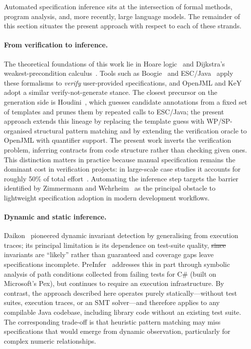 \documentclass[11pt]{article}
\makeatletter
\providecommand{\DIFaddtex}[1]{{\protect\color{blue}\uwave{#1}}} %
\providecommand{\DIFdeltex}[1]{{\protect\color{red}\sout{#1}}} %
\providecommand{\DIFaddbegin}{} %
\providecommand{\DIFaddend}{} %
\providecommand{\DIFdelbegin}{} %
\providecommand{\DIFdelend}{} %
\providecommand{\DIFadd}[1]{\texorpdfstring{\DIFaddtex{#1}}{#1}} %
\providecommand{\DIFdel}[1]{\texorpdfstring{\DIFdeltex{#1}}{}} %
\providecommand{\DIFscaledelfig}{0.5}
\newlength{\DIFdelgraphicswidth} %
\newlength{\DIFdelgraphicsheight} %
\providecommand{\DIFaddincludegraphics}[2][]{{\color{blue}\fbox{\DIFOincludegraphics[#1]{#2}}}} %
\providecommand{\DIFdelincludegraphics}[2][]{%
\sbox{\DIFdelgraphicsbox}{\DIFOincludegraphics[#1]{#2}}%
\settoboxwidth{\DIFdelgraphicswidth}{\DIFdelgraphicsbox} %
\settoboxtotalheight{\DIFdelgraphicsheight}{\DIFdelgraphicsbox} %
\scalebox{\DIFscaledelfig}{%
\parbox[b]{\DIFdelgraphicswidth}{\usebox{\DIFdelgraphicsbox}\\[-\baselineskip] \rule{\DIFdelgraphicswidth}{0em}}\llap{\resizebox{\DIFdelgraphicswidth}{\DIFdelgraphicsheight}{%
\setlength{\unitlength}{\DIFdelgraphicswidth}%
\begin{picture}(1,1)%
\thicklines\linethickness{2pt} %
{\color[rgb]{1,0,0}\put(0,0){\framebox(1,1){}}}%
{\color[rgb]{1,0,0}\put(0,0){\line( 1,1){1}}}%
{\color[rgb]{1,0,0}\put(0,1){\line(1,-1){1}}}%
\end{picture}%
}\hspace*{3pt}}} %
} %
\DeclareRobustCommand{\DIFaddbegin}{\DIFOaddbegin \let\includegraphics\DIFaddincludegraphics} %
\DeclareRobustCommand{\DIFaddend}{\DIFOaddend \let\includegraphics\DIFOincludegraphics} %
\DeclareRobustCommand{\DIFdelbegin}{\DIFOdelbegin \let\includegraphics\DIFdelincludegraphics} %
\DeclareRobustCommand{\DIFdelend}{\DIFOaddend \let\includegraphics\DIFOincludegraphics} %
\let\sout@orig\sout %
\renewcommand{\sout}[1]{\ifmmode\text{\sout@orig{\ensuremath{#1}}}\else\sout@orig{#1}\fi} %
\makeatother
\begin{document}
Automated specification inference sits at the intersection of formal methods, program analysis, and, more recently, large language models. The remainder of this section situates the present approach with respect to each of these strands.

\paragraph{From verification to inference.}
The theoretical foundations of this work lie in Hoare logic~\cite{hoare1969axiomatic} and Dijkstra's weakest-precondition calculus~\cite{dijkstra_guarded_1975, dijkstra1976discipline}. Tools such as Boogie~\cite{barnett2005weakest} and ESC/Java~\cite{flanagan2002extended, chalin2010jml} apply these formalisms to \emph{verify} user-provided specifications, and OpenJML and KeY adopt a similar verify-not-generate stance. The closest precursor on the generation side is Houdini~\cite{flanagan2001houdini}, which guesses candidate annotations from a fixed set of templates and prunes them by repeated calls to ESC/Java; the present approach extends this lineage by replacing the template guess with WP/SP-organised structural pattern matching and by extending the verification oracle to OpenJML with quantifier support. The present work inverts the verification problem, inferring contracts from code structure rather than checking given ones. This distinction matters in practice because manual specification remains the dominant cost in verification projects: in large-scale case studies it accounts for roughly 50\% of total effort~\cite{andronick_large-scale_2012, klein2014sel4, matichuk_cost_2015}. Automating the inference step targets the barrier identified by Zimmermann and Wehrheim~\cite{zimmermann2019lightweight} as the principal obstacle to lightweight specification adoption in modern development workflows.

\paragraph{Dynamic and static inference.}
Daikon~\cite{ernst2007daikon} pioneered dynamic invariant detection by generalising from execution traces; its principal limitation is its dependence on test-suite quality, \DIFdelbegin \DIFdel{since }\DIFdelend \DIFaddbegin \DIFadd{because }\DIFaddend invariants are ``likely'' rather than guaranteed and coverage gaps leave specifications incomplete. PreInfer~\cite{preinfer2017} addresses this in part through symbolic analysis of path conditions collected from failing tests for C\# (built on Microsoft's Pex), but continues to require an execution infrastructure. By contrast, the approach described here operates purely statically---without test suites, execution traces, or an SMT solver---and therefore applies to any compilable Java codebase, including library code without an existing test suite. The corresponding trade-off is that heuristic pattern matching may miss specifications that would emerge from dynamic observation, particularly for complex numeric relationships.
\end{document}

